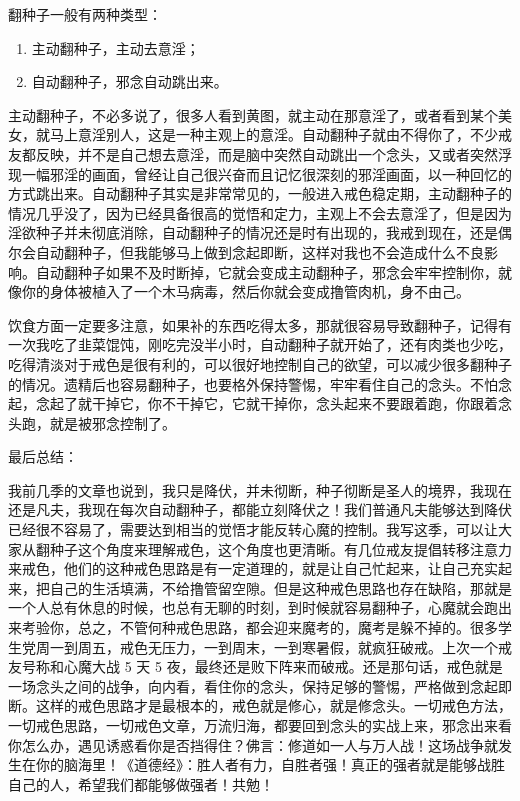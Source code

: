\documentclass{ctexart}
\begin{document}
翻种子一般有两种类型：

\begin{enumerate}
    \item 主动翻种子，主动去意淫；
    \item 自动翻种子，邪念自动跳出来。
\end{enumerate}

主动翻种子，不必多说了，很多人看到黄图，就主动在那意淫了，或者看到某个美女，就马上意淫别人，这是一种主观上的意淫。自动翻种子就由不得你了，不少戒友都反映，并不是自己想去意淫，而是脑中突然自动跳出一个念头，又或者突然浮现一幅邪淫的画面，曾经让自己很兴奋而且记忆很深刻的邪淫画面，以一种回忆的方式跳出来。自动翻种子其实是非常常见的，一般进入戒色稳定期，主动翻种子的情况几乎没了，因为已经具备很高的觉悟和定力，主观上不会去意淫了，但是因为淫欲种子并未彻底消除，自动翻种子的情况还是时有出现的，我戒到现在，还是偶尔会自动翻种子，但我能够马上做到念起即断，这样对我也不会造成什么不良影响。自动翻种子如果不及时断掉，它就会变成主动翻种子，邪念会牢牢控制你，就像你的身体被植入了一个木马病毒，然后你就会变成撸管肉机，身不由己。

饮食方面一定要多注意，如果补的东西吃得太多，那就很容易导致翻种子，记得有一次我吃了韭菜馄饨，刚吃完没半小时，自动翻种子就开始了，还有肉类也少吃，吃得清淡对于戒色是很有利的，可以很好地控制自己的欲望，可以减少很多翻种子的情况。遗精后也容易翻种子，也要格外保持警惕，牢牢看住自己的念头。不怕念起，念起了就干掉它，你不干掉它，它就干掉你，念头起来不要跟着跑，你跟着念头跑，就是被邪念控制了。

最后总结：

我前几季的文章也说到，我只是降伏，并未彻断，种子彻断是圣人的境界，我现在还是凡夫，我现在每次自动翻种子，都能立刻降伏之！我们普通凡夫能够达到降伏已经很不容易了，需要达到相当的觉悟才能反转心魔的控制。我写这季，可以让大家从翻种子这个角度来理解戒色，这个角度也更清晰。有几位戒友提倡转移注意力来戒色，他们的这种戒色思路是有一定道理的，就是让自己忙起来，让自己充实起来，把自己的生活填满，不给撸管留空隙。但是这种戒色思路也存在缺陷，那就是一个人总有休息的时候，也总有无聊的时刻，到时候就容易翻种子，心魔就会跑出来考验你，总之，不管何种戒色思路，都会迎来魔考的，魔考是躲不掉的。很多学生党周一到周五，戒色无压力，一到周末，一到寒暑假，就疯狂破戒。上次一个戒友号称和心魔大战 5 天 5 夜，最终还是败下阵来而破戒。还是那句话，戒色就是一场念头之间的战争，向内看，看住你的念头，保持足够的警惕，严格做到念起即断。这样的戒色思路才是最根本的，戒色就是修心，就是修念头。一切戒色方法，一切戒色思路，一切戒色文章，万流归海，都要回到念头的实战上来，邪念出来看你怎么办，遇见诱惑看你是否挡得住？佛言：修道如一人与万人战！这场战争就发生在你的脑海里！《道德经》：胜人者有力，自胜者强！真正的强者就是能够战胜自己的人，希望我们都能够做强者！共勉！
\end{document}
